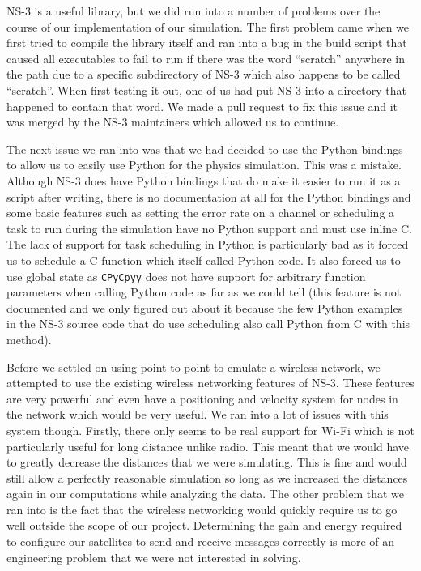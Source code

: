 \documentclass[a4paper,12pt]{article}
\newcommand{\CC}{C\nolinebreak\hspace{-.05em}\raisebox{.4ex}{\tiny\bf +}\nolinebreak\hspace{-.10em}\raisebox{.4ex}{\tiny\bf +}}
\def\CC{{C\nolinebreak[4]\hspace{-.05em}\raisebox{.4ex}{\tiny\bf ++}}}
\begin{document}
NS-3 is a useful library, but we did run into a number of problems over the
course of our implementation of our simulation. The first problem came when we
first tried to compile the library itself and ran into a bug in the build script
that caused all executables to fail to run if there was the word ``scratch''
anywhere in the path due to a specific subdirectory of NS-3 which also happens
to be called ``scratch''. When first testing it out, one of us had put NS-3 into
a directory that happened to contain that word. We made a pull request to fix
this issue and it was merged by the NS-3 maintainers which allowed us to
continue.

The next issue we ran into was that we had decided to use the Python bindings to
allow us to easily use Python for the physics simulation. This was a mistake.
Although NS-3 does have Python bindings that do make it easier to run it as a
script after writing, there is no documentation at all for the Python bindings
and some basic features such as setting the error rate on a channel or
scheduling a task to run during the simulation have no Python support and must
use inline \CC. The lack of support for task scheduling in Python is
particularly bad as it forced us to schedule a \CC{} function which itself
called Python code. It also forced us to use global state as \texttt{CPyCpyy}
does not have support for arbitrary function parameters when calling Python code
as far as we could tell (this feature is not documented and we only figured out
about it because the few Python examples in the NS-3 source code that do use
scheduling also call Python from \CC{} with this method).

Before we settled on using point-to-point to emulate a wireless network, we
attempted to use the existing wireless networking features of NS-3. These
features are very powerful and even have a positioning and velocity system for
nodes in the network which would be very useful. We ran into a lot of issues
with this system though. Firstly, there only seems to be real support for Wi-Fi
which is not particularly useful for long distance unlike radio. This meant that
we would have to greatly decrease the distances that we were simulating. This is
fine and would still allow a perfectly reasonable simulation so long as we
increased the distances again in our computations while analyzing the data. The
other problem that we ran into is the fact that the wireless networking would
quickly require us to go well outside the scope of our project. Determining the
gain and energy required to configure our satellites to send and receive
messages correctly is more of an engineering problem that we were not interested
in solving.
\end{document}
